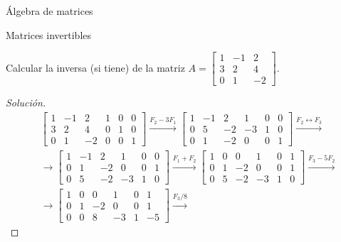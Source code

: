 \begin{chapter}{\'Algebra de matrices}
\begin{section}{Matrices invertibles}
            \begin{ejemplo*}
                Calcular la inversa (si tiene) de la matriz $A=\begin{bmatrix}
                1&-1&2\\ 3&2&4\\ 0&1&-2
                \end{bmatrix}$. 
            \end{ejemplo*}
            \begin{proof}[Solución]
                \begin{align*} 
                &\left[\begin{array}{rrr|rrr}    1&-1&2&1&0&0\\ 3&2&4&0&1&0\\ 0&1&-2&0&0&1 \end{array}\right]
                \stackrel{F_2-3 F_1}{\longrightarrow}
                \left[\begin{array}{rrr|rrr}    1&-1&2
                &1&0&0\\ 0&5&-2&-3&1&0\\ 0&1&-2&0&0&1 \end{array}\right]
                \stackrel{F_2\leftrightarrow F_3}{\longrightarrow} \\
                &\longrightarrow 
                \left[\begin{array}{rrr|rrr}    1&-1&2&1&0&0\\ 0&1&-2&0&0&1 \\ 0&5&-2&-3&1&0 \end{array}\right]
                \stackrel{F_1 + F_2}{\longrightarrow}
                \left[\begin{array}{rrr|rrr}    1&0&0&1&0&1\\ 0&1&-2&0&0&1 \\ 0&5&-2&-3&1&0 \end{array}\right]
                \stackrel{F_3-5F_2}{\longrightarrow} \\
                &\longrightarrow
                \left[\begin{array}{rrr|rrr}    1&0&0&1&0&1\\ 0&1&-2&0&0&1 \\ 0&0&8&-3&1&-5 \end{array}\right]
                \stackrel{F_3/8}{\longrightarrow}

\end{align*}
\end{proof}
\end{section}
\end{chapter}
